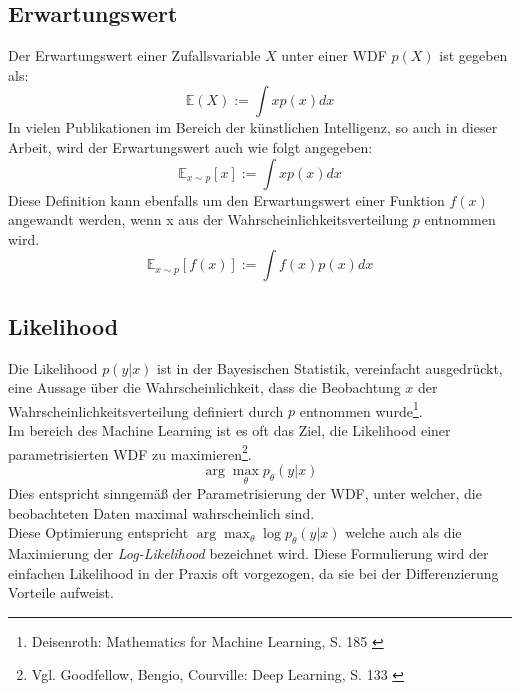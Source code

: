 \subsection{Erwartungswert}

Der Erwartungswert einer Zufallsvariable $X$ unter einer \ac{WDF} $p(X)$ ist gegeben als: 
\begin{equation}
    \mathbb E(X) := \int x p(x) dx
\end{equation}
In vielen Publikationen im Bereich der künstlichen Intelligenz, so auch in dieser Arbeit, wird der Erwartungswert auch wie folgt angegeben:
\begin{equation}
    \mathbb E_{x \sim p}[x] := \int x p(x) dx
\end{equation}
Diese Definition kann ebenfalls um den Erwartungswert einer Funktion $f(x)$ angewandt werden, wenn x aus der Wahrscheinlichkeitsverteilung $p$ entnommen wird. 
\begin{equation}
    \mathbb E_{x \sim p}[f(x)] := \int f(x) p(x) dx
\end{equation}

\subsection{Likelihood}

Die Likelihood $p(y|x)$ ist in der Bayesischen Statistik, vereinfacht ausgedrückt, eine Aussage über die Wahrscheinlichkeit, dass die Beobachtung $x$ der Wahrscheinlichkeitsverteilung definiert durch $p$ entnommen wurde\footnote{
    Deisenroth: Mathematics for Machine Learning, S. 185
    \cite{Deisenroth2020}
}. \\
Im bereich des Machine Learning ist es oft das Ziel, die Likelihood einer parametrisierten \ac{WDF} zu maximieren\footnote{
    Vgl. Goodfellow, Bengio, Courville: Deep Learning, S. 133
    \cite{Goodfellow-et-al-2016}
}. 
\begin{equation}
    \arg\max_\theta p_\theta(y|x)
\end{equation}
Dies entspricht sinngemäß der Parametrisierung der \ac{WDF}, unter welcher, die beobachteten Daten maximal wahrscheinlich sind. \\
Diese Optimierung entspricht $\arg\max_\theta \log p_\theta(y|x)$ welche auch als die Maximierung der \textit{Log-Likelihood} bezeichnet wird. Diese Formulierung wird der einfachen Likelihood in der Praxis oft vorgezogen, da sie bei der Differenzierung Vorteile aufweist.

